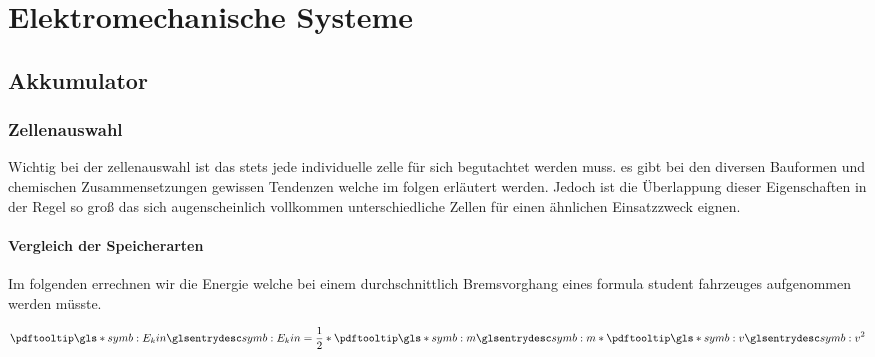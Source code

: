 
\chapter{Elektromechanische Systeme}

\section{Akkumulator}

\subsection{Zellenauswahl}

Wichtig bei der zellenauswahl ist das stets jede individuelle zelle für sich begutachtet werden muss. es gibt bei den diversen Bauformen und chemischen Zusammensetzungen gewissen Tendenzen welche im folgen erläutert werden. Jedoch ist die Überlappung dieser Eigenschaften in der Regel so groß das sich augenscheinlich vollkommen unterschiedliche Zellen für einen ähnlichen Einsatzzweck eignen.

\subsubsection{Vergleich der Speicherarten}


Im folgenden errechnen wir die Energie welche bei einem durchschnittlich Bremsvorghang eines formula student fahrzeuges aufgenommen werden müsste. 

\begin{equation}
\glsc{symb:E_kin} = \dfrac{1}{2} * \glsc{symb:m} * \glsc{symb:v}^2
\end{equation}

